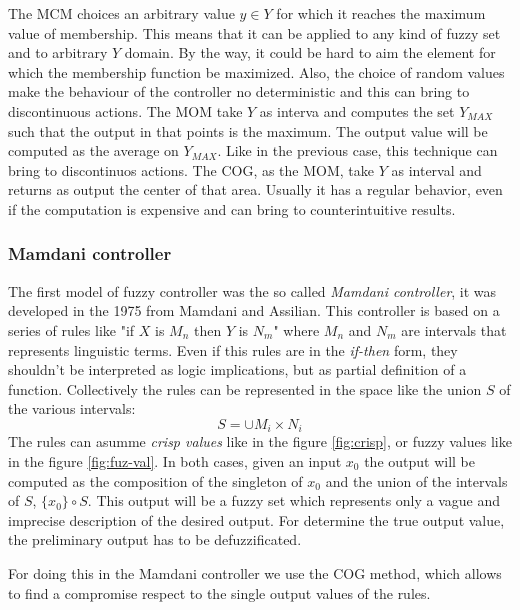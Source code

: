 \documentclass{article}
\begin{document}
The MCM choices an arbitrary value $y\in Y$ for which it reaches the maximum value of membership.
This means that it can be applied to any kind of fuzzy set and to arbitrary $Y$ domain. By the
way, it could be hard to aim the element for which the membership function be maximized. Also,
the choice of random values make the behaviour of the controller no deterministic and
this can bring to discontinuous actions. The MOM take $Y$ as interva and computes the
set $Y_{MAX}$ such that the output in that points is the maximum. The output value will be computed
as the average on $Y_{MAX}$. Like in the previous case, this technique can bring to discontinuos
actions. The COG, as the MOM, take $Y$ as interval and returns as output the center of that area.
Usually it has a regular behavior, even if the computation is expensive and can bring to
counterintuitive results.

\subsubsection{Mamdani controller}
The first model of fuzzy controller was the so called \textit{Mamdani controller},
it was developed in the 1975 from Mamdani and Assilian. This controller is based on a
series of rules like "if $X$ is $M_n$ then $Y$ is $N_m$" where $M_n$ and $N_m$ are
intervals that represents linguistic terms. Even if this rules are in the \textit{if-then}
form, they shouldn't be interpreted as logic implications, but as partial definition
of a function. Collectively the rules can be represented in the space like the union
$S$ of the various intervals:
$$S=\cup M_i\times N_i$$
The rules can asumme \textit{crisp values} like in the figure \ref{fig:crisp}, or
fuzzy values like in the figure \ref{fig:fuz-val}. In both cases, given an input $x_0$
the output will be computed as the composition of the singleton of $x_0$ and the
union of the intervals of $S$, $\{x_0\}\circ S$. This output will be a fuzzy set
which represents only a vague and imprecise description of the desired output. For
determine the true output value, the preliminary output has to be defuzzificated.

For doing this in the Mamdani controller we use the COG method, which allows to find a
compromise respect to the single output values of the rules.
\end{document}
